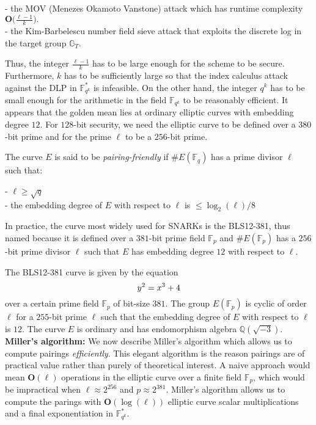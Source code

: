 \documentclass[11pt, lettersize, notitlepage, leqno, footskip=0.6cm]{article}
\newcommand{\bF}{\mathbb F}
\newcommand{\bq}{\mathbb Q}
\newcommand{\bFp}{\mathbb{F}_p}
\newcommand{\bFq}{\mathbb{F}_q}
\newcommand{\bFqk}{\mathbb{F}_{q^k}}
\newcommand{\bG}{\mathbb{G}}
\newcommand{\mbf}{\mathbf}
\newcommand{\bO}{\mbf{O}}
\newcommand{\vs}{\vspace{-2mm}}
\newcommand{\noin}{\noindent}
\numberwithin{equation}{section}
\begin{document}
\noin - the MOV (Menezes Okamoto Vanstone) attack which has runtime complexity $\mbf{O}\big(\frac{\ell-1}{k}).$ \\
- the Kim-Barbelescu number field sieve attack that exploits the discrete log in the target group $\bG_T$.

Thus, the integer $\frac{\ell-1}{k}$ has to be large enough for the scheme to be secure. Furthermore, $k$ has to be sufficiently large so that the index calculus attack against the DLP in $\bFqk^*$ is infeasible. On the other hand, the integer $q^k$ has to be small enough for the arithmetic in the field $\bF _{q^k}$ to be reasonably efficient. It appears that the golden mean  lies at ordinary elliptic curves with embedding degree $12$. For $128$-bit security, we need the elliptic curve to be defined over a $380$-bit prime and for the prime $\ell$ to be a $256$-bit prime.  

The curve $E$ is said to be \textit{pairing-friendly} if $\# E(\bFq)$ has a prime divisor $\ell$ such that:

\noin - $\ell\geq \sqrt{q}$\\
- the embedding degree of $E$ with respect to $\ell$ is  $\leq \log_2(\ell)/8$

In practice, the curve most widely used for SNARKs is the BLS12-381, thus named because it is defined over a $381$-bit prime field $\bFp$ and $\# E(\bFp)$ has a $256$-bit prime divisor $\ell$ such that $E$ has embedding degree $12$ with respect to $\ell$.

The BLS12-381 curve is given by the equation \vs $$ y^2 = x^3+4 \vs $$ over a certain prime field $\bFp$ of bit-size $381$. The group $E(\bFp)$ is cyclic of order $\ell$ for a $255$-bit prime $\ell$ such that the embedding degree of $E$ with respect to $\ell$ is $12$.    The curve $E$ is ordinary and has endomorphism algebra $\bq(\sqrt{-3})$.\\


\noin \textbf{Miller's algorithm:} We now describe Miller's algorithm which allows us to compute pairings \textit{efficiently}. This elegant algorithm is the reason pairings are of practical value rather than purely of theoretical interest. A naive approach would mean $\bO(\ell)$ operations in the elliptic curve over a finite field $\bFp$, which would be impractical when $\ell \approx 2^{256}$ and $p\approx 2^{381}$. Miller's algorithm allows us to compute the parings with $\bO(\log(\ell))$  elliptic curve scalar multiplications and a final exponentiation in $\bFqk^*$.
\end{document}
